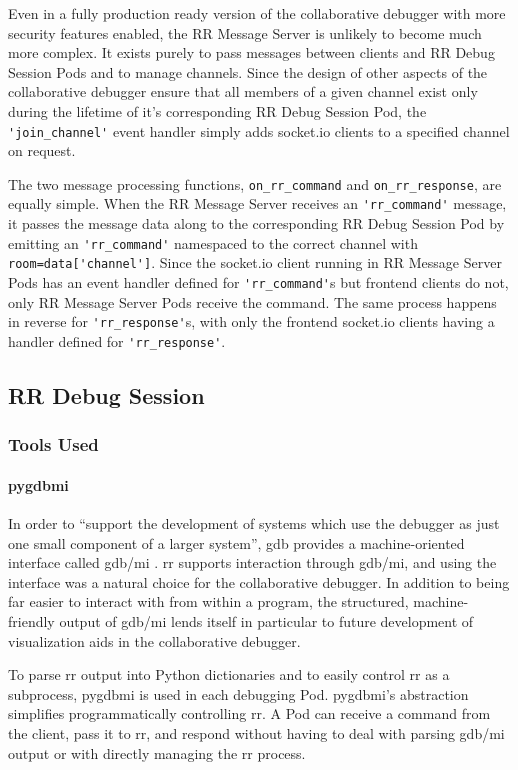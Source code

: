 \documentclass[12pt]{article}
\begin{document}
Even in a fully production ready version of the collaborative debugger
with more security features enabled, the RR Message Server is unlikely
to become much more complex.  It exists purely to pass messages
between clients and RR Debug Session Pods and to manage channels.
Since the design of other aspects of the collaborative debugger ensure
that all members of a given channel exist only during the lifetime of
it's corresponding RR Debug Session Pod, the
\lstinline{'join_channel'} event handler simply adds socket.io clients
to a specified channel on request.
\par

The two message processing functions, \lstinline{on_rr_command} and
\lstinline{on_rr_response}, are equally simple.  When the RR Message
Server receives an \lstinline{'rr_command'} message, it passes the
message data along to the corresponding RR Debug Session Pod by
emitting an \lstinline{'rr_command'} namespaced to the correct channel
with \lstinline{room=data['channel']}.  Since the socket.io client
running in RR Message Server Pods has an event handler defined for
\lstinline{'rr_command'}s but frontend clients do not, only RR Message
Server Pods receive the command.  The same process happens in reverse
for \lstinline{'rr_response'}s, with only the frontend socket.io
clients having a handler defined for \lstinline{'rr_response'}.

\subsection{RR Debug Session} \label{rrpods}

\subsubsection{Tools Used}

\paragraph{pygdbmi}

In order to ``support the development of systems which use the
debugger as just one small component of a larger system'', gdb
provides a machine-oriented interface called gdb/mi \cite{gdbman}. rr
supports interaction through gdb/mi, and using the interface was a
natural choice for the collaborative debugger.  In addition to being
far easier to interact with from within a program, the structured,
machine-friendly output of gdb/mi lends itself in particular to future
development of visualization aids in the collaborative debugger.
\par
To parse rr output into Python dictionaries and to easily control rr
as a subprocess, pygdbmi \cite{pygdbmi} is used in each debugging Pod.
pygdbmi's abstraction simplifies programmatically controlling rr.  A
Pod can receive a command from the client, pass it to rr, and respond
without having to deal with parsing gdb/mi output or with directly
managing the rr process.
\end{document}
